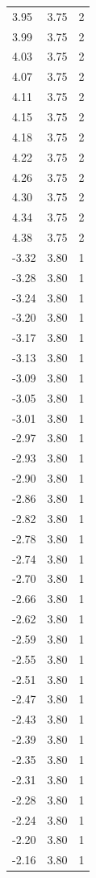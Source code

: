 \begin{longtable}{lrr}
  3.95 & 3.75 & 2 \\
  3.99 & 3.75 & 2 \\
  4.03 & 3.75 & 2 \\
  4.07 & 3.75 & 2 \\
  4.11 & 3.75 & 2 \\
  4.15 & 3.75 & 2 \\
  4.18 & 3.75 & 2 \\
  4.22 & 3.75 & 2 \\
  4.26 & 3.75 & 2 \\
  4.30 & 3.75 & 2 \\
  4.34 & 3.75 & 2 \\
  4.38 & 3.75 & 2 \\
  -3.32 & 3.80 & 1 \\
  -3.28 & 3.80 & 1 \\
  -3.24 & 3.80 & 1 \\
  -3.20 & 3.80 & 1 \\
  -3.17 & 3.80 & 1 \\
  -3.13 & 3.80 & 1 \\
  -3.09 & 3.80 & 1 \\
  -3.05 & 3.80 & 1 \\
  -3.01 & 3.80 & 1 \\
  -2.97 & 3.80 & 1 \\
  -2.93 & 3.80 & 1 \\
  -2.90 & 3.80 & 1 \\
  -2.86 & 3.80 & 1 \\
  -2.82 & 3.80 & 1 \\
  -2.78 & 3.80 & 1 \\
  -2.74 & 3.80 & 1 \\
  -2.70 & 3.80 & 1 \\
  -2.66 & 3.80 & 1 \\
  -2.62 & 3.80 & 1 \\
  -2.59 & 3.80 & 1 \\
  -2.55 & 3.80 & 1 \\
  -2.51 & 3.80 & 1 \\
  -2.47 & 3.80 & 1 \\
  -2.43 & 3.80 & 1 \\
  -2.39 & 3.80 & 1 \\
  -2.35 & 3.80 & 1 \\
  -2.31 & 3.80 & 1 \\
  -2.28 & 3.80 & 1 \\
  -2.24 & 3.80 & 1 \\
  -2.20 & 3.80 & 1 \\
  -2.16 & 3.80 & 1 \\

\end{longtable}
